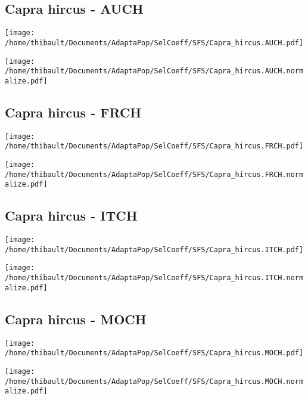 \subsection{Capra hircus - AUCH} 
 
\begin{minipage}{0.49\linewidth} 
\texttt{[image: /home/thibault/Documents/AdaptaPop/SelCoeff/SFS/Capra\_hircus.AUCH.pdf]} 
\end{minipage}
\begin{minipage}{0.49\linewidth}
\texttt{[image: /home/thibault/Documents/AdaptaPop/SelCoeff/SFS/Capra\_hircus.AUCH.normalize.pdf]} 
\end{minipage}
\subsection{Capra hircus - FRCH} 
 
\begin{minipage}{0.49\linewidth} 
\texttt{[image: /home/thibault/Documents/AdaptaPop/SelCoeff/SFS/Capra\_hircus.FRCH.pdf]} 
\end{minipage}
\begin{minipage}{0.49\linewidth}
\texttt{[image: /home/thibault/Documents/AdaptaPop/SelCoeff/SFS/Capra\_hircus.FRCH.normalize.pdf]} 
\end{minipage}
\subsection{Capra hircus - ITCH} 
 
\begin{minipage}{0.49\linewidth} 
\texttt{[image: /home/thibault/Documents/AdaptaPop/SelCoeff/SFS/Capra\_hircus.ITCH.pdf]} 
\end{minipage}
\begin{minipage}{0.49\linewidth}
\texttt{[image: /home/thibault/Documents/AdaptaPop/SelCoeff/SFS/Capra\_hircus.ITCH.normalize.pdf]} 
\end{minipage}
\subsection{Capra hircus - MOCH} 
 
\begin{minipage}{0.49\linewidth} 
\texttt{[image: /home/thibault/Documents/AdaptaPop/SelCoeff/SFS/Capra\_hircus.MOCH.pdf]} 
\end{minipage}
\begin{minipage}{0.49\linewidth}
\texttt{[image: /home/thibault/Documents/AdaptaPop/SelCoeff/SFS/Capra\_hircus.MOCH.normalize.pdf]} 
\end{minipage}
